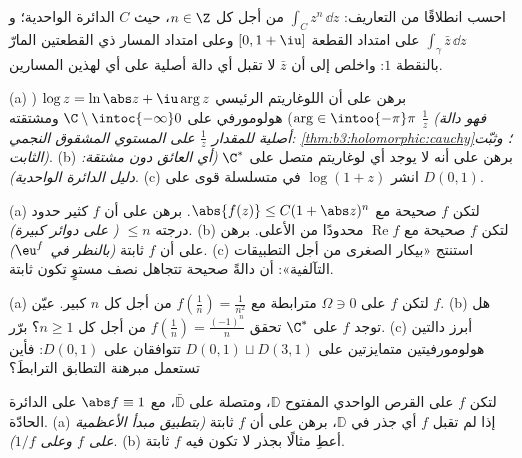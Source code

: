\begin{exercise}[$\star$]\label{exo:b3:holomorphic:2}
احسب انطلاقًا من التعاريف: $\int_{C}z^n\,\dd z$ من أجل كل $n
\in \Z$، حيث $C$
الدائرة الواحدية؛ و $\int_\gamma\bar z\,\dd z$ على امتداد القطعة $[0, 1+\iu]$ وعلى
امتداد المسار ذي القطعتين المارّ بالنقطة $1$: واخلص إلى أن
$\bar z$ لا تقبل أي دالة أصلية على أي  لهذين المسارين.
\end{exercise}

\begin{exercise}[$\star\star$]\label{exo:b3:holomorphic:3}
(a) برهن على أن اللوغاريتم الرئيسي $\log z = \ln\abs z +
\iu\arg z$ ($\arg \in \intoo{-\pi}\pi$)
هولومورفي على $\C\setminus\intoc{-\infty}0$ ومشتقته $\frac1z$ \emph{(فهو دالة أصلية
للمقدار $\frac1z$ على المستوي المشقوق النجمي: \cref{thm:b3:holomorphic:cauchy}؛
وثبّت الثابت)}.
(b) برهن على أنه لا يوجد أي لوغاريتم متصل على $\C^*$ \emph{(أي
العائق دون مشتقة: دليل الدائرة الواحدية)}.
(c) انشر $\log(1 + z)$ في متسلسلة قوى على $D(0,1)$.
\end{exercise}

\begin{exercise}[$\star\star$]\label{exo:b3:holomorphic:4}
(a) لتكن $f$ صحيحة مع $\abs{f(z)} \leq C(1 + \abs
z)^{n}$. برهن على أن $f$ كثير حدود درجته
$\leq n$ \emph{( على دوائر كبيرة)}.
(b) لتكن $f$ صحيحة مع $\operatorname{Re}f$ محدودًا من الأعلى. برهن على أن
$f$ ثابتة \emph{(بالنظر في $\eu^{f}$)}.
(c) استنتج «بيكار الصغرى من أجل التطبيقات التآلفية»: أن دالةً
صحيحة تتجاهل نصف مستوٍ تكون ثابتة.
\end{exercise}

\begin{exercise}[$\star\star$]\label{exo:b3:holomorphic:5}
(a) لتكن $f$  على $\Omega \ni 0$ مترابطة مع $f(\frac1n) = \frac1{n^2}$
من أجل كل $n$ كبير. عيّن $f$.
(b) هل توجد  $f$ على $\C^*$ تحقق $f(\frac1n) =
\frac{(-1)^n}{n}$ من أجل
كل $n \geq 1$؟ برّر.
(c) أبرز دالتين هولومورفيتين متمايزتين على $D(0,1)\sqcup D(3,1)$ تتوافقان على
$D(0,1)$: فأين تستعمل مبرهنة التطابق الترابطَ؟
\end{exercise}

\begin{exercise}[$\star\star$]\label{exo:b3:holomorphic:6}
لتكن $f$  على القرص الواحدي المفتوح $\mathbb D$،
ومتصلة على $\bar{\mathbb D}$، مع $\abs f \equiv 1$ على الدائرة الحادّة.
(a) إذا لم تقبل $f$ أي جذر في $\mathbb D$، برهن على أن $f$
ثابتة \emph{(بتطبيق مبدأ الأعظمية على $f$ وعلى $1/f$)}.
(b) أعطِ مثالًا بجذر لا تكون فيه $f$ ثابتة.
\end{exercise}

